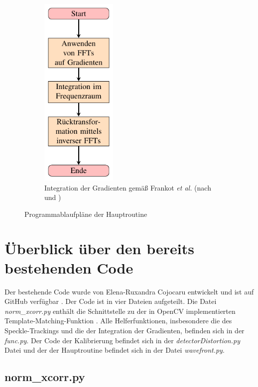\begin{figure}[htbp]
\begin{subfigure}[b]{0.45\textwidth}
		\includegraphics[width=0.4\textwidth]{pdf/graph_fc}
		\caption[Frankot-Chellappa]{Integration der Gradienten gemäß Frankot \textit{et al.} (nach \cite{FC88} und \cite{Kov04})}
		\label{fig:graph_fc}
	\end{subfigure}
	\caption[Algorithmen]{Programmablaufpläne der Hauptroutine}
\end{figure}

\section{Überblick über den bereits bestehenden Code}

Der bestehende Code wurde von Elena-Ruxandra Cojocaru entwickelt und ist auf GitHub verfügbar \cite{Coj17}. Der Code ist in vier Dateien aufgeteilt. Die Datei \textit{norm\_xcorr.py} enthält die Schnittstelle zu der in OpenCV implementierten Template-Matching-Funktion \cite{SA17}. Alle Helferfunktionen, insbesondere die des Speckle-Trackings und die der Integration der Gradienten, befinden sich in der \textit{func.py}. Der Code der Kalibrierung befindet sich in der \textit{detectorDistortion.py} Datei und der der Hauptroutine befindet sich in der Datei \textit{wavefront.py}. 

\subsection{norm\_xcorr.py}

